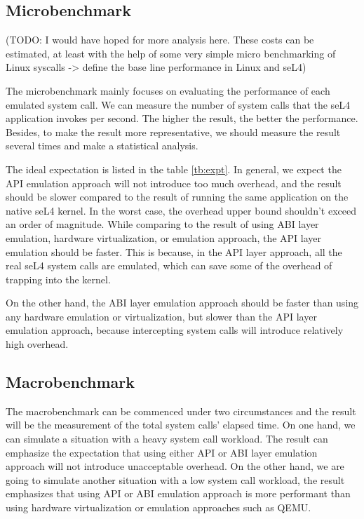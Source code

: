 \subsection{Microbenchmark}

(TODO: I would have hoped for more analysis here. These costs can be estimated, at least with the help of some very simple micro benchmarking of Linux syscalls -> define the base line performance in Linux and seL4)

The microbenchmark mainly focuses on evaluating the performance of each emulated system call. We can measure the number of system calls that the seL4 application invokes per second. The higher the result, the better the performance. Besides, to make the result more representative, we should measure the result several times and make a statistical analysis.

The ideal expectation is listed in the table \ref{tb:expt}. In general, we expect the API emulation approach will not introduce too much overhead, and the result should be slower compared to the result of running the same application on the native seL4 kernel. In the worst case, the overhead upper bound shouldn't exceed an order of magnitude. While comparing to the result of using ABI layer emulation, hardware virtualization, or emulation approach, the API layer emulation should be faster. This is because, in the API layer approach, all the real seL4 system calls are emulated, which can save some of the overhead of trapping into the kernel.  

On the other hand, the ABI layer emulation approach should be faster than using any hardware emulation or virtualization, but slower than the API layer emulation approach, because intercepting system calls will introduce relatively high overhead.   

\subsection{Macrobenchmark}

The macrobenchmark can be commenced under two circumstances and the result will be the measurement of the total system calls' elapsed time. On one hand, we can simulate a situation with a heavy system call workload. The result can emphasize the expectation that using either API or ABI layer emulation approach will not introduce unacceptable overhead. On the other hand, we are going to simulate another situation with a low system call workload, the result emphasizes that using API or ABI emulation approach is more performant than using hardware virtualization or emulation approaches such as QEMU.